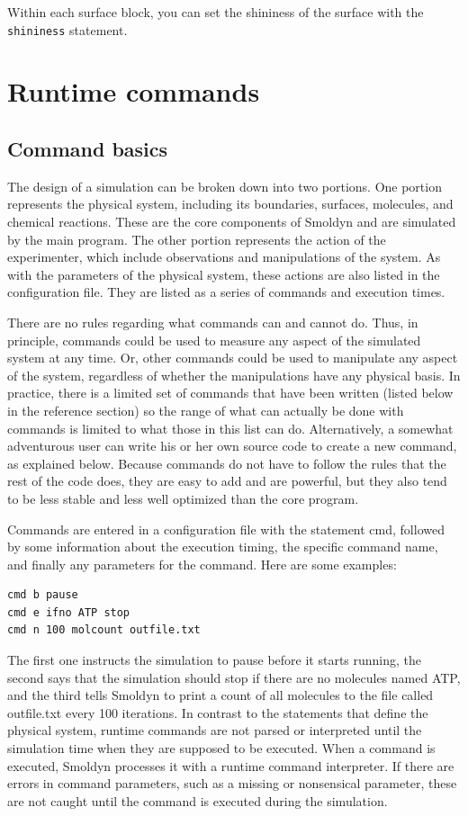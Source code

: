 \documentclass {book}
\newcommand {\ttt} {\texttt}
\begin{document}
Within each surface block, you can set the shininess of the surface with the \ttt{shininess} statement.


\chapter{Runtime commands}

\section{Command basics}

The design of a simulation can be broken down into two portions. One portion represents the physical system, including its boundaries, surfaces, molecules, and chemical reactions. These are the core components of Smoldyn and are simulated by the main program. The other portion represents the action of the experimenter, which include observations and manipulations of the system. As with the parameters of the physical system, these actions are also listed in the configuration file. They are listed as a series of commands and execution times.

There are no rules regarding what commands can and cannot do. Thus, in principle, commands could be used to measure any aspect of the simulated system at any time. Or, other commands could be used to manipulate any aspect of the system, regardless of whether the manipulations have any physical basis. In practice, there is a limited set of commands that have been written (listed below in the reference section) so the range of what can actually be done with commands is limited to what those in this list can do. Alternatively, a somewhat adventurous user can write his or her own source code to create a new command, as explained below. Because commands do not have to follow the rules that the rest of the code does, they are easy to add and are powerful, but they also tend to be less stable and less well optimized than the core program.

Commands are entered in a configuration file with the statement cmd, followed by some information about the execution timing, the specific command name, and finally any parameters for the command. Here are some examples:

\begin{lstlisting}[style=SSAC]
cmd b pause
cmd e ifno ATP stop
cmd n 100 molcount outfile.txt
\end{lstlisting}

The first one instructs the simulation to pause before it starts running, the second says that the simulation should stop if there are no molecules named ATP, and the third tells Smoldyn to print a count of all molecules to the file called outfile.txt every 100 iterations. In contrast to the statements that define the physical system, runtime commands are not parsed or interpreted until the simulation time when they are supposed to be executed. When a command is executed, Smoldyn processes it with a runtime command interpreter. If there are errors in command parameters, such as a missing or nonsensical parameter, these are not caught until the command is executed during the simulation.
\end{document}
